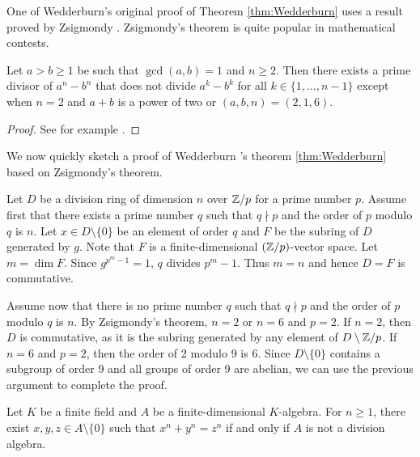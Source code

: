 
One of Wedderburn's original proof of Theorem \ref{thm:Wedderburn} 
uses a 
result proved
by Zsigmondy \cite{MR1546236}. Zsigmondy's theorem is 
quite popular in mathematical contests. 


\begin{theorem}[Zsigmondy]
    Let $a>b\geq1$ be such that $\gcd(a,b)=1$ and $n\geq2$. 
    Then there exists a prime divisor of $a^n-b^n$ that does not
    divide $a^k-b^k$ for all $k\in\{1,\dots,n-1\}$ except 
    when $n=2$ and $a+b$ is a power of two or $(a,b,n)=(2,1,6)$. 
\end{theorem}


\begin{proof}
    See for example \cite{MR3172590}. 
\end{proof}

We now quickly sketch a proof of Wedderburn
's theorem \ref{thm:Wedderburn} 
based on Zsigmondy's theorem.  

Let $D$ be a division ring of dimension $n$ over $\mathbb{Z}/p$ for a prime
number $p$. Assume 
first that there exists a prime number $q$ such that 
$q\nmid p$ and the order of $p$ modulo $q$ is $n$. Let $x\in D\setminus\{0\}$ be an element of order $q$ and $F$ be the subring
of $D$ generated by $g$. Note that $F$ is a finite-dimensional
$(\mathbb{Z}/p)$-vector space. Let $m=\dim F$. 
Since $g^{p^m-1}=1$, $q$ divides $p^m-1$. Thus $m=n$ and
hence $D=F$ is commutative. 

Assume now that there is no prime number $q$ such that 
$q\nmid p$ and the order of $p$ modulo $q$ is $n$. By Zsigmondy's 
theorem, $n=2$ or $n=6$ and $p=2$. If $n=2$, then 
$D$ is commutative, as it is the subring generated by
any element of $D\setminus \mathbb{Z}/p$. If $n=6$ and $p=2$, then 
the order of 2 modulo 9 is 6. Since $D\setminus\{0\}$ contains
a subgroup of order 9 and all groups of order 9 are abelian, 
we can use the previous argument to complete the proof. 



\begin{theorem}
    Let $K$ be a finite field and $A$ be a finite-dimensional $K$-algebra.
    For $n\geq1$, there exist $x,y,z\in A\setminus\{0\}$ 
    such that $x^n+y^n=z^n$ if and only if 
    $A$ is not a division algebra.
\end{theorem}

